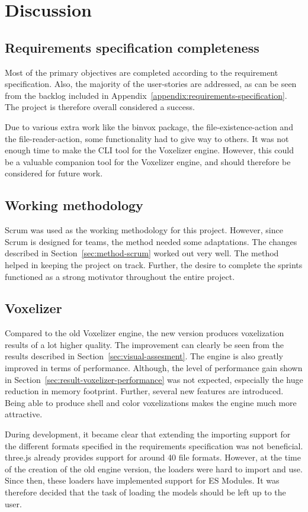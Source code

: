 \chapter{Discussion}
\section{Requirements specification completeness}
Most of the primary objectives are completed according to the requirement specification. Also, the majority of the user-stories are addressed, as can be seen from the backlog included in Appendix~\ref{appendix:requirements-specification}. The project is therefore overall considered a success.

Due to various extra work like the binvox package, the file-existence-action and the file-reader-action, some functionality had to give way to others. It was not enough time to make the CLI tool for the Voxelizer engine. However, this could be a valuable companion tool for the Voxelizer engine, and should therefore be considered for future work.

\section{Working methodology}
Scrum was used as the working methodology for this project. However, since Scrum is designed for teams, the method needed some adaptations. The changes described in Section~\ref{sec:method-scrum} worked out very well. The method helped in keeping the project on track. Further, the desire to complete the sprints functioned as a strong motivator throughout the entire project.

\section{Voxelizer}
Compared to the old Voxelizer engine, the new version produces voxelization results of a lot higher quality. The improvement can clearly be seen from the results described in Section~\ref{sec:visual-assesment}. The engine is also greatly improved in terms of performance. Although, the level of performance gain shown in Section~\ref{sec:result-voxelizer-performance} was not expected, especially the huge reduction in memory footprint. Further, several new features are introduced. Being able to produce shell and color voxelizations makes the engine much more attractive.

During development, it became clear that extending the importing support for the different formats specified in the requirements specification was not beneficial. three.js already provides support for around 40 file formats. However, at the time of the creation of the old engine version, the loaders were hard to import and use. Since then, these loaders have implemented support for ES Modules. It was therefore decided that the task of loading the models should be left up to the user.

